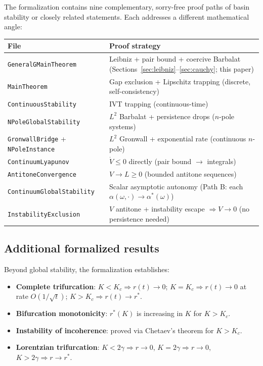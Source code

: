 \documentclass[11pt,a4paper]{article}
\theoremstyle{definition}
\begin{document}
The formalization contains nine complementary, sorry-free proof paths of basin stability or closely related statements. Each addresses a different mathematical angle:

\medskip
\begin{center}
\begin{tabular}{lp{9cm}}
\textbf{File} & \textbf{Proof strategy} \\
\hline
\texttt{GeneralGMainTheorem} & Leibniz + pair bound + coercive Barbalat (Sections~\ref{sec:leibniz}--\ref{sec:cauchy}; this paper) \\
\texttt{MainTheorem} & Gap exclusion + Lipschitz trapping (discrete, self-consistency) \\
\texttt{ContinuousStability} & IVT trapping (continuous-time) \\
\texttt{NPoleGlobalStability} & $L^2$ Barbalat + persistence drops ($n$-pole systems) \\
\texttt{GronwallBridge} + \texttt{NPoleInstance} & $L^2$ Gronwall + exponential rate (continuous $n$-pole) \\
\texttt{ContinuumLyapunov} & $\dot{V} \leq 0$ directly (pair bound $\to$ integrals) \\
\texttt{AntitoneConvergence} & $V \to L \geq 0$ (bounded antitone sequences) \\
\texttt{ContinuumGlobalStability} & Scalar asymptotic autonomy (Path B: each $\alpha(\omega,\cdot) \to \alpha^*(\omega)$) \\
\texttt{InstabilityExclusion} & $V$ antitone + instability escape $\Rightarrow V \to 0$ (no persistence needed)
\end{tabular}
\end{center}

\subsection{Additional formalized results}

Beyond global stability, the formalization establishes:

\begin{itemize}
\item \textbf{Complete trifurcation}: $K < K_c \Rightarrow r(t) \to 0$; $K = K_c \Rightarrow r(t) \to 0$ at rate $O(1/\sqrt{t})$; $K > K_c \Rightarrow r(t) \to r^*$.
\item \textbf{Bifurcation monotonicity}: $r^*(K)$ is increasing in $K$ for $K > K_c$.
\item \textbf{Instability of incoherence}: proved via Chetaev's theorem for $K > K_c$.
\item \textbf{Lorentzian trifurcation}: $K < 2\gamma \Rightarrow r \to 0$, $K = 2\gamma \Rightarrow r \to 0$, $K > 2\gamma \Rightarrow r \to r^*$.
\end{itemize}
\end{document}
